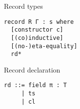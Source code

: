 \documentclass[acmlarge,fleqn]{acmart}\settopmatter{}
\begin{document}
Record types
\begin{verbatim}
record R Γ : s where
  [constructor c]
  [(co)inductive]
  [(no-)eta-equality]
  rd*
\end{verbatim}

Record declaration
\begin{verbatim}
rd ::= field π : T
     | ts
     | cl
\end{verbatim}


\begin{acks}                            %
\end{acks}


%


\end{document}

